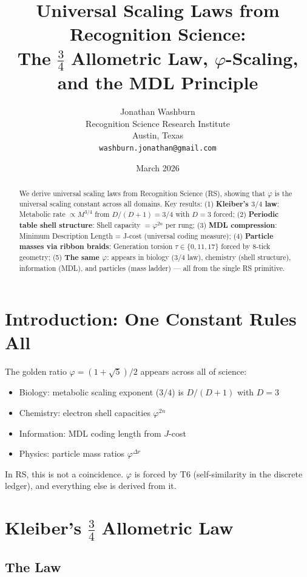 \documentclass[12pt,a4paper]{article}
\title{Universal Scaling Laws from Recognition Science:\\
The $\frac{3}{4}$ Allometric Law, $\varphi$-Scaling, and the MDL Principle}
\author{Jonathan Washburn\\
Recognition Science Research Institute\\
Austin, Texas\\
\texttt{washburn.jonathan@gmail.com}}
\date{March 2026}
\theoremstyle{definition}
\theoremstyle{remark}
\begin{document}
\maketitle

\begin{abstract}
We derive universal scaling laws from Recognition Science (RS), showing that $\varphi$ 
is the universal scaling constant across all domains. Key results:
(1) \textbf{Kleiber's $3/4$ law}: Metabolic rate $\propto M^{3/4}$ from $D/(D+1) = 3/4$ 
with $D = 3$ forced; 
(2) \textbf{Periodic table shell structure}: Shell capacity $= \varphi^{2n}$ per rung;
(3) \textbf{MDL compression}: Minimum Description Length = J-cost (universal coding measure);
(4) \textbf{Particle masses via ribbon braids}: Generation torsion $\tau \in \{0, 11, 17\}$ 
forced by 8-tick geometry;
(5) \textbf{The same $\varphi$}: appears in biology (3/4 law), chemistry (shell structure), 
information (MDL), and particles (mass ladder) — all from the single RS primitive.
\end{abstract}

\section{Introduction: One Constant Rules All}

The golden ratio $\varphi = (1+\sqrt{5})/2$ appears across all of science:
\begin{itemize}
\item Biology: metabolic scaling exponent ($3/4$) is $D/(D+1)$ with $D = 3$
\item Chemistry: electron shell capacities $\varphi^{2n}$
\item Information: MDL coding length from $J$-cost
\item Physics: particle mass ratios $\varphi^{\Delta r}$
\end{itemize}

In RS, this is not a coincidence. $\varphi$ is forced by T6 (self-similarity in the 
discrete ledger), and everything else is derived from it.

\section{Kleiber's $\frac{3}{4}$ Allometric Law}

\subsection{The Law}
\end{document}
